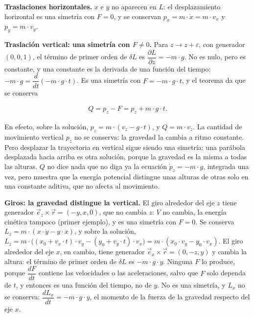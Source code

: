 \documentclass[11pt,a4paper,spanish]{book}
\begin{document}
\textbf{Traslaciones horizontales.} \(x\) e \(y\) no aparecen en \(L\):
el desplazamiento horizontal es una simetría con \(F = 0\), y se
conservan \(p_x = m \cdot \dot{x} = m \cdot v_x\) y
\(p_y = m \cdot v_y\).

\textbf{Traslación vertical: una simetría con \(F \neq 0\).} Para
\(z \to z + \varepsilon\), con generador \((0, 0, 1)\), el término de
primer orden de \(\delta L\) es
\(\dfrac{\partial L}{\partial z} = -m \cdot g\). No es nulo, pero es
constante, y una constante es la derivada de una función del tiempo:
\(-m \cdot g = \dfrac{d}{dt}(-m \cdot g \cdot t)\). Es una simetría con
\(F = -m \cdot g \cdot t\), y el teorema da que se conserva

\[
\begin{aligned}
Q = p_z - F = p_z + m \cdot g \cdot t.
\end{aligned}
\]

En efecto, sobre la solución, \(p_z = m \cdot (v_z - g \cdot t)\), y
\(Q = m \cdot v_z\). La cantidad de movimiento vertical \(p_z\) no se
conserva: la gravedad la cambia a ritmo constante. Pero desplazar la
trayectoria en vertical sigue siendo una simetría: una parábola
desplazada hacia arriba es otra solución, porque la gravedad es la misma
a todas las alturas. \(Q\) no dice nada que no diga ya la ecuación
\(\dot{p}_z = -m \cdot g\), integrada una vez, pero muestra que la
energía potencial distingue unas alturas de otras solo en una constante
aditiva, que no afecta al movimiento.

\textbf{Giros: la gravedad distingue la vertical.} El giro alrededor del
eje \(z\) tiene generador \(\vec{e}_z \times \vec{r} = (-y, x, 0)\), que
no cambia \(z\): \(V\) no cambia, la energía cinética tampoco (primer
ejemplo), y es una simetría con \(F = 0\). Se conserva
\(L_z = m \cdot (x \cdot \dot{y} - y \cdot \dot{x})\), y sobre la
solución,
\(L_z = m \cdot \big((x_0 + v_x \cdot t) \cdot v_y - (y_0 + v_y \cdot t) \cdot v_x\big) = m \cdot (x_0 \cdot v_y - y_0 \cdot v_x)\).
El giro alrededor del eje \(x\), en cambio, tiene generador
\(\vec{e}_x \times \vec{r} = (0, -z, y)\) y cambia la altura: el término
de primer orden de \(\delta L\) es \(-m \cdot g \cdot y\). Ninguna \(F\)
lo produce, porque \(\dfrac{dF}{dt}\) contiene las velocidades o las
aceleraciones, salvo que \(F\) solo dependa de \(t\), y entonces es una
función del tiempo, no de \(y\). No es una simetría, y \(L_x\) no se
conserva: \(\dfrac{dL_x}{dt} = -m \cdot g \cdot y\), el momento de la
fuerza de la gravedad respecto del eje \(x\).
\end{document}
